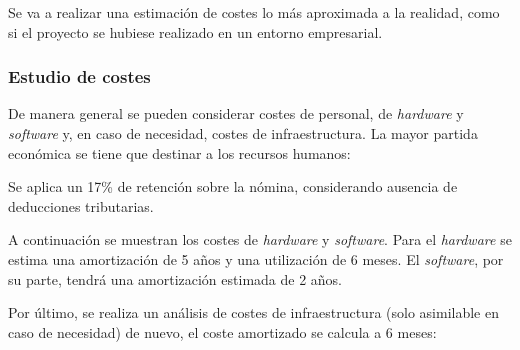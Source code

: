 Se va a realizar una estimación de costes lo más aproximada a la realidad, como si el proyecto se hubiese realizado en un entorno empresarial. 

\subsubsection{Estudio de costes}

De manera general se pueden considerar costes de personal, de \emph{hardware} y \emph{software} y, en caso de necesidad, costes de infraestructura. La mayor partida económica se tiene que destinar a los recursos humanos:


Se aplica un 17\% de retención sobre la nómina, considerando ausencia de deducciones tributarias.

A continuación se muestran los costes de \emph{hardware} y \emph{software}. Para el \emph{hardware} se estima una amortización de 5 años y una utilización de 6 meses. El \emph{software}, por su parte, tendrá una amortización estimada de 2 años. 


Por último, se realiza un análisis de costes de infraestructura (solo asimilable en caso de necesidad) de nuevo, el coste amortizado se calcula a 6 meses:



